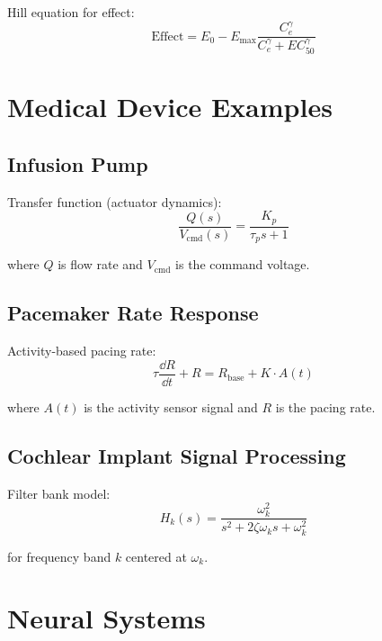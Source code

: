 Hill equation for effect:
\begin{equation}
\text{Effect} = E_0 - E_{\max}\frac{C_e^\gamma}{C_e^\gamma + EC_{50}^\gamma}
\end{equation}

\section{Medical Device Examples}
\label{sec:medical_devices}

\subsection{Infusion Pump}

Transfer function (actuator dynamics):
\begin{equation}
\frac{Q(s)}{V_{\text{cmd}}(s)} = \frac{K_p}{\tau_p s + 1}
\end{equation}

where $Q$ is flow rate and $V_{\text{cmd}}$ is the command voltage.

\subsection{Pacemaker Rate Response}

Activity-based pacing rate:
\begin{equation}
\tau\frac{\dd R}{\dd t} + R = R_{\text{base}} + K \cdot A(t)
\end{equation}

where $A(t)$ is the activity sensor signal and $R$ is the pacing rate.

\subsection{Cochlear Implant Signal Processing}

Filter bank model:
\begin{equation}
H_k(s) = \frac{\omega_k^2}{s^2 + 2\zeta\omega_k s + \omega_k^2}
\end{equation}

for frequency band $k$ centered at $\omega_k$.

\section{Neural Systems}
\label{sec:neural}


